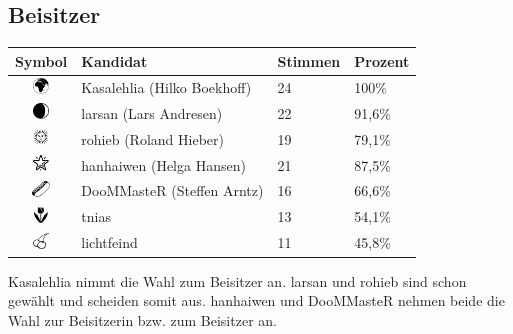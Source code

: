 \documentclass[a4paper,12pt]{scrartcl}
\begin{document}
\subsection*{Beisitzer}
\begin{tabular}{|c|l|l|l|}
  \hline
  \textbf{Symbol} & \textbf{Kandidat} & \textbf{Stimmen} & \textbf{Prozent} \\
  \hline
  \includegraphics[height=12pt]{images/mv20151206-wahl-beisitzer-1.pdf} &
  Kasalehlia (Hilko Boekhoff)      & 24 & 100\% \\
  \includegraphics[height=12pt]{images/mv20151206-wahl-beisitzer-2.pdf} &
  larsan (Lars Andresen)           & 22 & 91{,}6\% \\
  \includegraphics[height=12pt]{images/mv20151206-wahl-beisitzer-3.pdf} &
  rohieb (Roland Hieber)           & 19 & 79{,}1\% \\
  \includegraphics[height=12pt]{images/mv20151206-wahl-beisitzer-4.pdf} &
  hanhaiwen (Helga Hansen)         & 21 & 87{,}5\% \\
  \includegraphics[height=12pt]{images/mv20151206-wahl-beisitzer-5.pdf} &
  DooMMasteR (Steffen Arntz)       & 16 & 66{,}6\% \\
  \includegraphics[height=12pt]{images/mv20151206-wahl-beisitzer-6.pdf} &
  tnias                            & 13 & 54{,}1\% \\
  \includegraphics[height=12pt]{images/mv20151206-wahl-beisitzer-7.pdf} &
  lichtfeind                       & 11 & 45{,}8\% \\
  \hline
\end{tabular}

Kasalehlia nimmt die Wahl zum Beisitzer an. larsan und rohieb sind schon
gewählt und scheiden somit aus. hanhaiwen und DooMMasteR nehmen beide die Wahl
zur Beisitzerin bzw. zum Beisitzer an.
\end{document}

